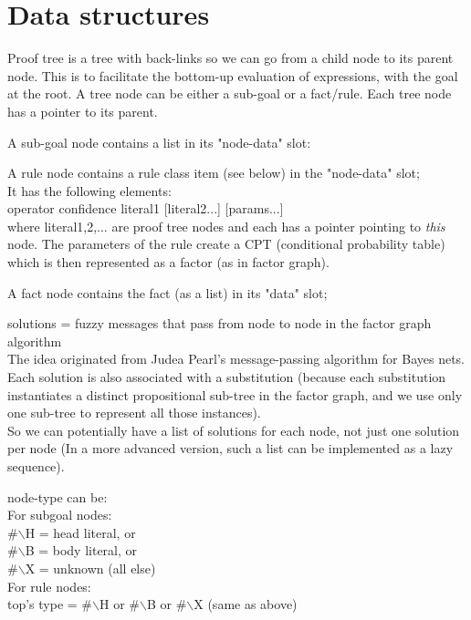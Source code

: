 \section{Data structures}
Proof tree is a tree with back-links so we can go from a child node to its parent node.
This is to facilitate the bottom-up evaluation of expressions, with the goal at the root.
A tree node can be either a sub-goal or a fact/rule.
Each tree node has a pointer to its parent.

A sub-goal node contains a list in its "node-data" slot:\\
\tab {}

A rule node contains a rule class item (see below) in the "node-data" slot; \\
It has the following elements: \\
\tab operator confidence literal1 [literal2...] [params...]\\
where literal1,2,... are proof tree nodes and each has a pointer pointing to \textit{this} node.
The parameters of the rule create a CPT (conditional probability table) which is then
represented as a factor (as in factor graph).

A fact node contains the fact (as a list) in its "data" slot;

solutions = fuzzy messages that pass from node to node in the factor graph algorithm\\
The idea originated from Judea Pearl's message-passing algorithm for Bayes nets.
Each solution is also associated with a substitution (because each substitution instantiates
a distinct propositional sub-tree in the factor graph, and we use only one sub-tree to
represent all those instances).\\
So we can potentially have a list of solutions for each node, not just one solution per node
(In a more advanced version, such a list can be implemented as a lazy sequence).

node-type can be:\\
\tab For subgoal nodes:\\
\tab\tab \#$\backslash$H = head literal, or\\
\tab\tab \#$\backslash$B = body literal, or\\
\tab\tab \#$\backslash$X = unknown (all else)\\
\tab For rule nodes:\\
\tab\tab top's type = \#$\backslash$H or \#$\backslash$B or \#$\backslash$X (same as above)


